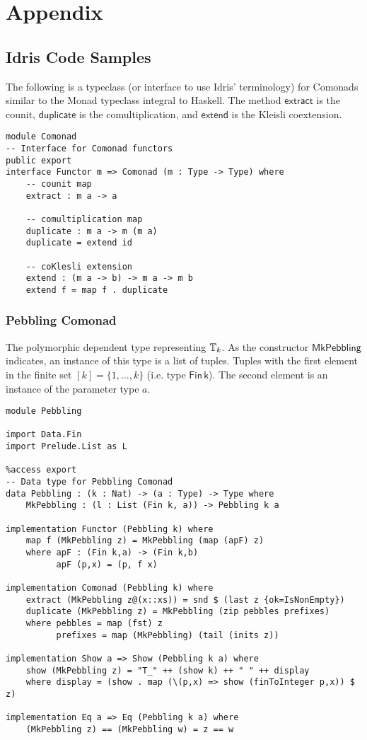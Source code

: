 \chapter{Appendix}
\appendix 
\section{Idris Code Samples}
The following is a typeclass (or interface to use Idris' terminology) for Comonads similar to the Monad typeclass integral to Haskell. The method $\mathsf{extract}$ is the counit, $\mathsf{duplicate}$ is the comultiplication, and $\mathsf{extend}$ is the Kleisli coextension. 
\begin{verbatim}
module Comonad
-- Interface for Comonad functors 
public export
interface Functor m => Comonad (m : Type -> Type) where
    -- counit map
    extract : m a -> a

    -- comultiplication map
    duplicate : m a -> m (m a)
    duplicate = extend id

    -- coKlesli extension
    extend : (m a -> b) -> m a -> m b
    extend f = map f . duplicate
\end{verbatim}
\subsection{Pebbling Comonad}
The polymorphic dependent type representing ${\mathbb{T}_{k}}$. As the constructor $\mathsf{MkPebbling}$ indicates, an instance of this type is a list of tuples. Tuples with the first element in the finite set $[k] = \{1,\dots,k\}$ (i.e. type $\mathsf{Fin} \, \mathsf{k}$). The second element is an instance of the parameter type $a$. 
\begin{verbatim}
module Pebbling

import Data.Fin
import Prelude.List as L

%access export
-- Data type for Pebbling Comonad
data Pebbling : (k : Nat) -> (a : Type) -> Type where
    MkPebbling : (l : List (Fin k, a)) -> Pebbling k a
    
implementation Functor (Pebbling k) where
    map f (MkPebbling z) = MkPebbling (map (apF) z)     
    where apF : (Fin k,a) -> (Fin k,b)
          apF (p,x) = (p, f x)

implementation Comonad (Pebbling k) where
    extract (MkPebbling z@(x::xs)) = snd $ (last z {ok=IsNonEmpty})
    duplicate (MkPebbling z) = MkPebbling (zip pebbles prefixes) 
    where pebbles = map (fst) z 
          prefixes = map (MkPebbling) (tail (inits z)) 

implementation Show a => Show (Pebbling k a) where
    show (MkPebbling z) = "T_" ++ (show k) ++ " " ++ display 
    where display = (show . map (\(p,x) => show (finToInteger p,x)) $ z)

implementation Eq a => Eq (Pebbling k a) where
    (MkPebbling z) == (MkPebbling w) = z == w
\end{verbatim}

